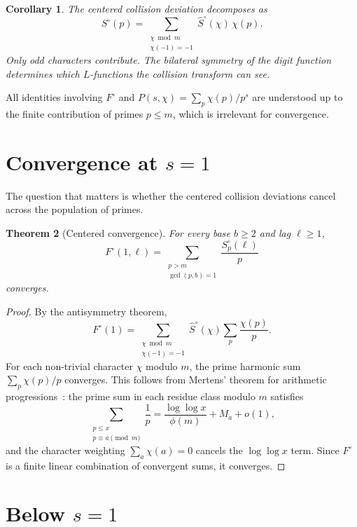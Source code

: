 \documentclass[12pt]{amsart}
\newtheorem{theorem}{Theorem}
\newtheorem{corollary}[theorem]{Corollary}
\theoremstyle{definition}
\theoremstyle{remark}
\begin{document}
\begin{corollary}
The centered collision deviation decomposes as
\[
S^{\circ}(p) = \sum_{\substack{\chi \bmod m \\
\chi(-1) = -1}} \hat{S}^{\circ}(\chi)\, \chi(p).
\]
Only odd characters contribute. The bilateral symmetry
of the digit function determines which $L$-functions
the collision transform can see.
\end{corollary}

All identities involving $F^{\circ}$ and
$P(s, \chi) = \sum_p \chi(p)/p^s$ are understood up
to the finite contribution of primes $p \le m$, which
is irrelevant for convergence.

\section{Convergence at $s = 1$}

The question that matters is whether the centered collision
deviations cancel across the population of primes.

\begin{theorem}[Centered convergence]\label{thm:convergence}
For every base $b \ge 2$ and lag $\ell \ge 1$,
\[
F^{\circ}(1, \ell) = \sum_{\substack{p > m \\
\gcd(p,b) = 1}} \frac{S^{\circ}_p(\ell)}{p}
\]
converges.
\end{theorem}

\begin{proof}
By the antisymmetry theorem,
\[
F^{\circ}(1) = \sum_{\substack{\chi \bmod m \\
\chi(-1) = -1}} \hat{S}^{\circ}(\chi)
\sum_p \frac{\chi(p)}{p}.
\]
For each non-trivial character $\chi$ modulo $m$, the
prime harmonic sum $\sum_p \chi(p)/p$ converges. This
follows from Mertens' theorem for arithmetic
progressions~\cite{mertens,davenport}: the prime sum in
each residue class modulo $m$ satisfies
\[
\sum_{\substack{p \le x \\ p \equiv a \pmod{m}}}
\frac{1}{p} = \frac{\log\log x}{\phi(m)} + M_a + o(1),
\]
and the character weighting $\sum_a \chi(a) = 0$ cancels
the $\log\log x$ term. Since $F^{\circ}$ is a finite
linear combination of convergent sums, it converges.
\end{proof}

\section{Below $s = 1$}
\end{document}
